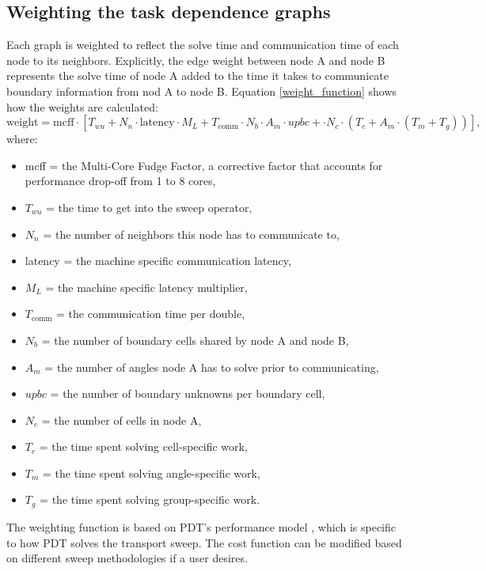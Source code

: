 \subsection{Weighting the task dependence graphs}

Each graph is weighted to reflect the solve time and communication time of each node to its neighbors. Explicitly, the edge weight between node A and node B represents the solve time of node A added to the time it takes to communicate boundary information from nod A to node B. Equation \ref{weight_function} shows how the weights are calculated:
\begin{equation}
\text{weight} = \text{mcff}\cdot [T_{wu} + N_n\cdot \text{latency}\cdot M_L + T_{\text{comm}}\cdot N_b\cdot A_m\cdot upbc + \cdot N_c\cdot (T_c + A_m\cdot (T_m + T_g))],
\label{weight_function}
\end{equation}
where:
\begin{itemize}
  \item mcff = the Multi-Core Fudge Factor, a corrective factor that accounts for performance drop-off from 1 to 8 cores,
  \item $T_{wu}$ = the time to get into the sweep operator,
  \item $N_n$ = the number of neighbors this node has to communicate to,
  \item latency = the machine specific communication latency,
  \item $M_L$ = the machine specific latency multiplier,
  \item $T_{\text{comm}}$ = the communication time per double,
  \item $N_b$ = the number of boundary cells shared by node A and node B,
  \item $A_m$ = the number of angles node A has to solve prior to communicating,
  \item $upbc$ = the number of boundary unknowns per boundary cell,
  \item $N_c$ = the number of cells in node A,
  \item $T_c$ = the time spent solving cell-specific work,
  \item $T_m$ = the time spent solving angle-specific work,
  \item $T_g$ = the time spent solving group-specific work.
\end{itemize}
The weighting function is based on PDT's performance model \cite{mpadams2013,mpadams2015,mpadamsjcp}, which is specific to how PDT solves the transport sweep. The cost function can be modified based on different sweep methodologies if a user desires.

